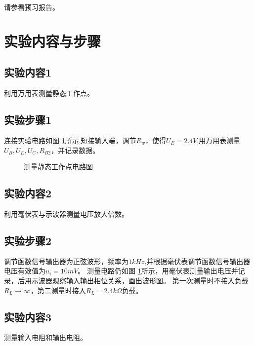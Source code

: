 \documentclass[a4paper,11pt,UTF8]{ctexart}
\begin{document}
请参看预习报告。

\section{实验内容与步骤}
\subsection{实验内容1}
	利用万用表测量静态工作点。
\subsection{实验步骤1}
  连接实验电路如图 \ref{fig:static}所示,短接输入端，调节$R_w$，使得$U_E=2.4V$,用万用表测量$U_B,U_E,U_C,R_{B2}$，并记录数据。
  \begin{figure}[htbp]
    \centering
    \caption{测量静态工作点电路图}
    \label{fig:static}
    \end{figure}
\subsection{实验内容2}
利用毫伏表与示波器测量电压放大倍数。
\subsection{实验步骤2}
调节函数信号输出器为正弦波形，频率为$1kHz$,并根据毫伏表调节函数信号输出器电压有效值为$u_i=10mV$。
测量电路仍如图 \ref{fig:static}所示，用毫伏表测量输出电压并记录，后用示波器观察输入输出相位关系，画出波形图。
第一次测量时不接入负载$R_L\rightarrow\infty$，第二测量时接入$R_L=2.4k\Omega$负载。
\subsection{实验内容3}
测量输入电阻和输出电阻。
\end{document}
